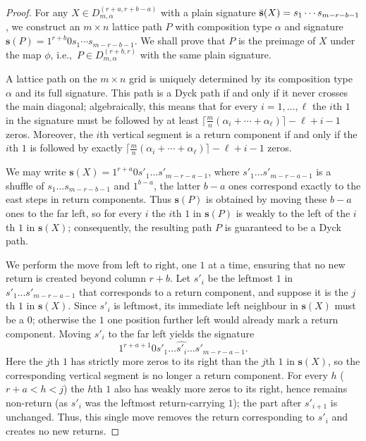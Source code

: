 \documentclass[11pt,a4paper,reqno]{article}
\newcommand{\al}{\alpha}
\newcommand{\psig}{\Bar{\mathbf{s}}}
\newcommand{\sig}{\mathbf{s}}
\newcommand{\LiLan}{}
\begin{document}
{\begin{proof}
        {\LiLan For any $X\in D^{(r+a,r+b-a)}_{m,\alpha}$ with a plain signature $\psig(X)=s_1\cdots s_{m-r-b-1}$, we construct an $m\times n$ lattice path $P$ with composition type $\al$ and signature $\sig(P)=1^{r+b}0s_1\cdots s_{m-r-b-1}$. We shall prove that $P$ is the preimage of $X$ under the map $\phi$, i.e.,\ $P\in D^{(r+b,r)}_{m,\alpha}$ with the same plain signature.


        A lattice path on the $m\times n$ grid is uniquely determined by its composition type $\al$ and its full signature.
        This path is a Dyck path if and only if it never crosses the main diagonal; algebraically, this means that for every $i=1,\ldots,\ell$ the $i$th $1$ in the signature must be followed by at least
        $
        \lceil\frac{m}{n}(\al_{i}+\cdots+\al_{\ell})\rceil -\ell+i-1
        $
        zeros.
        Moreover, the $i$th vertical segment is a return component if and only if the $i$th $1$ is followed by exactly
        $
        \lceil\frac{m}{n}(\al_{i}+\cdots+\al_{\ell})\rceil -\ell+i-1
        $
        zeros.






We may write $\sig(X)=1^{r+a}0s'_1\dots s'_{m-r-a-1}$, where $s'_1\dots s'_{m-r-a-1}$ is a shuffle of $s_1\dots s_{m-r-b-1}$ and $1^{b-a}$, the latter $b-a$ ones correspond exactly to the east steps in return components.
Thus $\sig(P)$ is obtained by moving these $b-a$ ones to the far left, so for every $i$ the $i$th $1$ in $\sig(P)$ is weakly to the left of the $i$th $1$ in $\sig(X)$; consequently, the resulting path $P$ is guaranteed to be a Dyck path.

We perform the move from left to right, one $1$ at a time, ensuring that no new return is created beyond column $r+b$.
Let $s'_i$ be the leftmost $1$ in $s'_1\dots s'_{m-r-a-1}$ that corresponds to a return component, and suppose it is the $j$th $1$ in $\sig(X)$.
Since $s'_i$ is leftmost, its immediate left neighbour in $\sig(X)$ must be a $0$; otherwise the $1$ one position further left would already mark a return component.
Moving $s'_i$ to the far left yields the signature
$$
1^{r+a+1}0s'_1\dots\widehat{s'_i}\dots s'_{m-r-a-1}.
$$
Here the $j$th $1$ has strictly more zeros to its right than the $j$th $1$ in $\sig(X)$, so the corresponding vertical segment is no longer a return component.
For every $h$ ($r+a<h<j$) the $h$th $1$ also has weakly more zeros to its right, hence remains non-return (as $s'_i$ was the leftmost return-carrying $1$); the part after $s'_{i+1}$ is unchanged.
Thus, this single move removes the return corresponding to $s'_i$ and creates no new returns.

}
\end{proof}}
\end{document}
